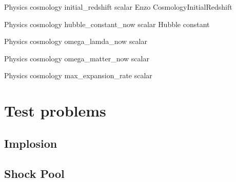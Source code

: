 \documentclass{book}
\begin{document}
\Parameter
{Physics}
{cosmology}
{initial\_redshift}
{scalar}
{}
{Enzo CosmologyInitialRedshift}
{}
{}
 		 	 	
\Parameter
{Physics}
{cosmology}
{hubble\_constant\_now}
{scalar}
{}
{Hubble constant}
{}
{}

\Parameter
{Physics}
{cosmology}
{omega\_lamda\_now}
{scalar}
{}
{}
{}
{}

\Parameter
{Physics}
{cosmology}
{omega\_matter\_now}
{scalar}
{}
{}
{}
{}

\Parameter
{Physics}
{cosmology}
{max\_expansion\_rate}
{scalar}
{}
{}
{}
{}

\section{Test problems}
\subsection{Implosion}


\subsection{Shock Pool}

\end{document}
